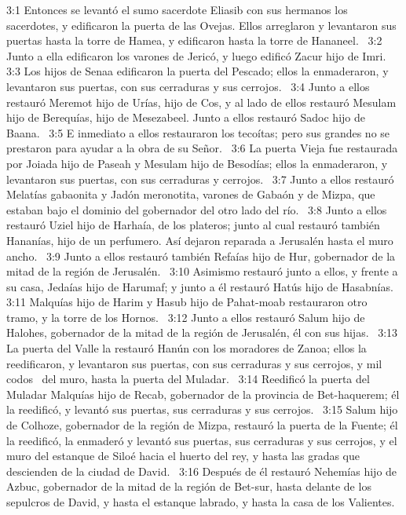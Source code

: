 3:1 Entonces se levantó el sumo sacerdote Eliasib con sus hermanos los sacerdotes, y edificaron la puerta de las Ovejas. Ellos arreglaron y levantaron sus puertas hasta la torre de Hamea, y edificaron hasta la torre de Hananeel.  
3:2 Junto a ella edificaron los varones de Jericó, y luego edificó Zacur hijo de Imri.  
3:3 Los hijos de Senaa edificaron la puerta del Pescado; ellos la enmaderaron, y levantaron sus puertas, con sus cerraduras y sus cerrojos.  
3:4 Junto a ellos restauró Meremot hijo de Urías, hijo de Cos, y al lado de ellos restauró Mesulam hijo de Berequías, hijo de Mesezabeel. Junto a ellos restauró Sadoc hijo de Baana.  
3:5 E inmediato a ellos restauraron los tecoítas; pero sus grandes no se prestaron para ayudar a la obra de su Señor.  
3:6 La puerta Vieja fue restaurada por Joiada hijo de Paseah y Mesulam hijo de Besodías; ellos la enmaderaron, y levantaron sus puertas, con sus cerraduras y cerrojos.  
3:7 Junto a ellos restauró Melatías gabaonita y Jadón meronotita, varones de Gabaón y de Mizpa, que estaban bajo el dominio del gobernador del otro lado del río.  
3:8 Junto a ellos restauró Uziel hijo de Harhaía, de los plateros; junto al cual restauró también Hananías, hijo de un perfumero. Así dejaron reparada a Jerusalén hasta el muro ancho.  
3:9 Junto a ellos restauró también Refaías hijo de Hur, gobernador de la mitad de la región de Jerusalén.  
3:10 Asimismo restauró junto a ellos, y frente a su casa, Jedaías hijo de Harumaf; y junto a él restauró Hatús hijo de Hasabnías.  
3:11 Malquías hijo de Harim y Hasub hijo de Pahat-moab restauraron otro tramo, y la torre de los Hornos.  
3:12 Junto a ellos restauró Salum hijo de Halohes, gobernador de la mitad de la región de Jerusalén, él con sus hijas.  
3:13 La puerta del Valle la restauró Hanún con los moradores de Zanoa; ellos la reedificaron, y levantaron sus puertas, con sus cerraduras y sus cerrojos, y mil codos  del muro, hasta la puerta del Muladar.  
3:14 Reedificó la puerta del Muladar Malquías hijo de Recab, gobernador de la provincia de Bet-haquerem; él la reedificó, y levantó sus puertas, sus cerraduras y sus cerrojos.  
3:15 Salum hijo de Colhoze, gobernador de la región de Mizpa, restauró la puerta de la Fuente; él la reedificó, la enmaderó y levantó sus puertas, sus cerraduras y sus cerrojos, y el muro del estanque de Siloé hacia el huerto del rey, y hasta las gradas que descienden de la ciudad de David.  
3:16 Después de él restauró Nehemías hijo de Azbuc, gobernador de la mitad de la región de Bet-sur, hasta delante de los sepulcros de David, y hasta el estanque labrado, y hasta la casa de los Valientes.  
